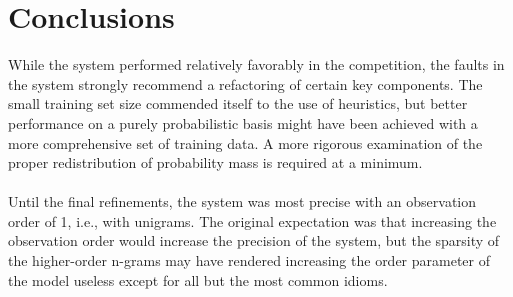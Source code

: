 \documentclass[11pt,a4paper]{article}
\begin{document}
{\tiny\pgfplotstabletypeset[header=true]{\fmicro}}


{\tiny\pgfplotstabletypeset[header=true]{\fmacro}}

\section{Conclusions}

While the system performed relatively favorably in the competition,
the faults in the system strongly recommend a refactoring of certain
key components. The small training set size commended itself to the
use of heuristics, but better performance on a purely probabilistic
basis might have been achieved with a more comprehensive set of
training data. A more rigorous examination of the proper redistribution
of probability mass is required at a minimum.

\paragraph{}
Until the final refinements, the system was most precise with an
observation order of 1, i.e., with unigrams. The original expectation
was that increasing the observation order would increase the precision
of the system, but the sparsity of the higher-order n-grams may have
rendered increasing the order parameter of the model useless except
for all but the most common idioms.
\end{document}
